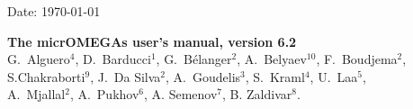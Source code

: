 \documentclass[12pt,a4paper]{article}
\begin{document}
\def\micro{{\tt micrOMEGAs}}
\def\ra{\rightarrow}
\def\calchep{{\tt CalcHEP}}

\def\suspect{{\tt SuSpect}}
\def\mbmb{m_b(m_b)}
\def\mt{m_t}
\def\dMb{\Delta m_b}
\def\dMq{\Delta m_q}
\def\delrho{\Delta\rho}
\def\bsgamma{b\to s\gamma}
\def\bsmu{B_s\to \mu^+\mu^-}
\def\gmuon{(g-2)_\mu}
\def\noi{\noindent}
\def\VERSION{6.2}
\def\neuto{\tilde\chi^0_1}
\def\neuti{\tilde\chi^0_i}
\def\neutt{\tilde\chi^0_2}
\def\neuth{\tilde\chi^0_3}
\def\smodels{{\tt SModelS}}
\def\lilith{{\tt Lilith}}
\def\HB{{\tt HiggsBounds}}
\def\HS{{\tt HiggsSignals}}

\def\eg{{\it e.g.}}
\def\ie{{\it i.e.}}

\def\br{{\rm BR}}

\def\ent{{\mathfrak{s}}}


\def\wimpsim{{\tt WimpSim}}
\def\pppc{{\tt }PPPC4DM$\nu$}
\newcommand{\gb}{\color{blue}}
\def\SK#1{\textcolor{cyan}{#1}}

\begin{flushright}
   \vspace*{-18mm}
   Date: \today
\end{flushright}
\vspace*{2mm}




\begin{center}


{\Large\bf The micrOMEGAs  user's manual, version \VERSION} \\[8mm]


{\large   G.~Alguero$^{4}$, D.~Barducci$^{1}$, G.~B\'elanger$^{2}$, A.~Belyaev$^{10}$, F.~Boudjema$^2$, \\[2mm]
          S.Chakraborti$^9$,  J.~Da Silva$^{2}$, A.~Goudelis$^{3}$, S.~Kraml$^{4}$, U.~Laa$^{5}$,\\[2mm]
 A.~Mjallal$^{2}$,            A.~Pukhov$^6$, A. Semenov$^7$, B. Zaldivar$^{8}$.}\\[4mm]
\end{center}
\end{document}
